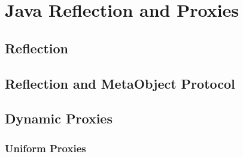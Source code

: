 \chapter{Java Reflection and Proxies}\label{Java Reflection and Proxies}

\section{Reflection}\label{Reflection}

\section{Reflection and Meta­Object Protocol}\label{Reflection and Meta­Object Protocol}

\section{Dynamic Proxies}\label{Dynamic Proxies}

\subsection{Uniform Proxies}\label{Uniform Proxies}